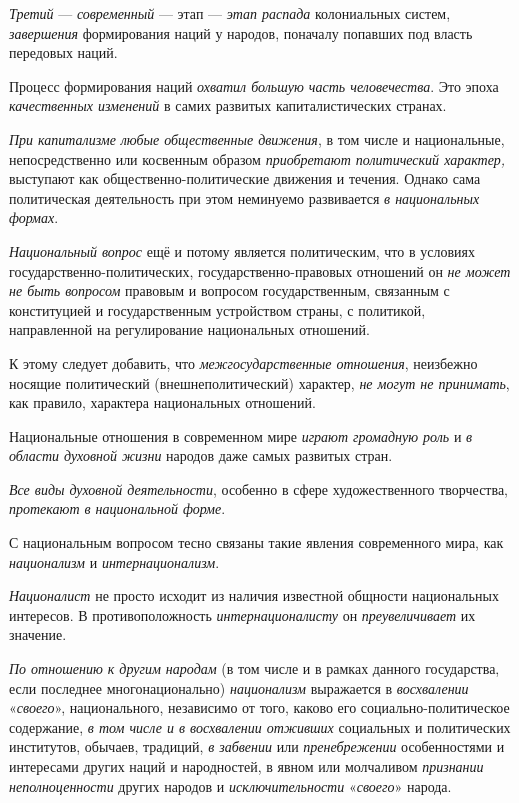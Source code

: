 \documentclass[a4paper,14pt,russian]{extreport}
\begin{document}
\emph{Третий} --- \emph{современный} --- этап --- \emph{этап распада} колониальных систем, \emph{завершения} формирования наций у народов, поначалу попавших под власть передовых наций.

Процесс формирования наций \emph{охватил большую часть человечества}. Это эпоха \emph{качественных изменений} в самих развитых капиталистических странах.

\emph{При капитализме} \emph{любые общественные движения}, в том числе и национальные, непосредственно или косвенным образом \emph{приобретают политический характер,} выступают как общественно-политические движения и течения. Однако сама политическая деятельность при этом неминуемо развивается \emph{в национальных формах}.

\emph{Национальный вопрос} ещё и потому является политическим, что в условиях государственно-политических, государственно-правовых отношений он \emph{не может не быть вопросом} правовым и вопросом государственным, связанным с конституцией и государственным устройством страны, с политикой, направленной на регулирование национальных отношений.

К этому следует добавить, что \emph{межгосударственные отношения}, неизбежно носящие политический (внешнеполитический) характер, \emph{не могут не принимать}, как правило, характера национальных отношений.

Национальные отношения в современном мире \emph{играют громадную роль} и \emph{в области духовной жизни} народов даже самых развитых стран.

\emph{Все виды духовной деятельности}, особенно в сфере художественного творчества, \emph{протекают в национальной форме}.

С национальным вопросом тесно связаны такие явления современного мира, как \emph{национализм} и \emph{интернационализм}.

\emph{Националист} не просто исходит из наличия известной общности национальных интересов. В противоположность \emph{интернационалисту} он \emph{преувеличивает} их значение.

\emph{По отношению к другим народам} (в том числе и в рамках данного государства, если последнее многонационально) \emph{национализм} выражается в \emph{восхвалении} «\emph{своего}», национального, независимо от того, каково его социально-политическое содержание, \emph{в том числе и в восхвалении отживших} социальных и политических институтов, обычаев, традиций, \emph{в забвении} или \emph{пренебрежении} особенностями и интересами других наций и народностей, в явном или молчаливом \emph{признании неполноценности} других народов и \emph{исключительности} «\emph{своего}» народа.
\end{document}
